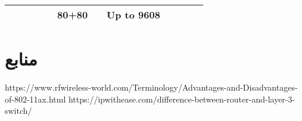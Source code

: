 \documentclass{article}
\begin{document}
\begin{latin}
\begin{table}[H]
{\begin{tabular}{|cccccccccccc|}
\multicolumn{1}{|c|}{}                                                                                               & \multicolumn{1}{c|}{}                              & \multicolumn{1}{c|}{}                                                                                          & \multicolumn{1}{c|}{}                                                                                 & \multicolumn{1}{c|}{}                                                                                    & \multicolumn{1}{c|}{80+80}                                                                               & \multicolumn{1}{c|}{}                                                                                              & \multicolumn{1}{c|}{Up to 9608}                                                                                                                          & \multicolumn{1}{c|}{}                                                                                           & \multicolumn{1}{c|}{}                                                                                            & \multicolumn{1}{c|}{}                                 &                                   \\ \hline
\end{tabular}%
}
\end{table}
\end{latin}












\section*{منابع}
\renewcommand{\section}[2]{}%
\begin{thebibliography}{99} %


\begin{LTRitems}

\resetlatinfont

 https://www.rfwireless-world.com/Terminology/Advantages-and-Disadvantages-of-802-11ax.html
 https://ipwithease.com/difference-between-router-and-layer-3-switch/
\end{LTRitems}

\end{thebibliography}
\end{document}
